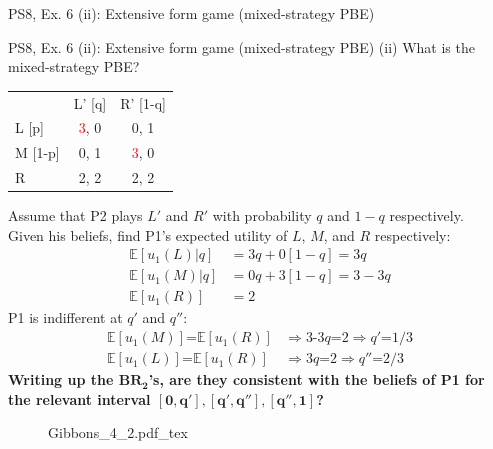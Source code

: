 \begin{frame}{PS8, Ex. 6 (ii): Extensive form game (mixed-strategy PBE)}
\begin{multicols}{2}
      \vfill\null
    \end{multicols}
\end{frame}
\begin{frame}{PS8, Ex. 6 (ii): Extensive form game (mixed-strategy PBE)}
    (ii) What is the mixed-strategy PBE? \vspace{-8pt}
    \begin{multicols}{2}
      \begin{table}
        \begin{tabular}{l|c|c|}
          \multicolumn{1}{c}{} & \multicolumn{1}{c}{L' [q]} & \multicolumn{1}{c}{R' [1-q]} \\\cline{2-3}
          L [p]   & \textcolor{red}{3}, 0 & 0, \color{blue}1 \\\cline{2-3}
          M [1-p] & 0, \color{blue}1 & \textcolor{red}{3}, 0 \\\cline{2-3}
          R       & 2, \color{blue}2 & 2, \color{blue}2 \\\cline{2-3}
        \end{tabular}
      \end{table} \vspace{-4pt}
      Assume that P2 plays $L'$ and $R'$ with probability $q$ and $1-q$ respectively.\\\smallskip
      Given his beliefs, find P1's expected utility of $L$, $M$, and $R$ respectively: \vspace{-4pt}
      \begin{align*}
        \mathbb{E}[u_1(L)|q]&=3q+0[1-q]=3q\\
        \mathbb{E}[u_1(M)|q]&=0q+3[1-q]=3-3q\\
        \mathbb{E}[u_1(R)]&=2
      \end{align*}
      P1 is indifferent at $q'$ and $q''$: \vspace{-6pt}
      \begin{align*}
        \mathbb{E}[u_1(M)]\text{=}\mathbb{E}[u_1(R)]&\Rightarrow \text{3-3}q\text{=}2\Rightarrow q'\text{=}1/3\\
        \mathbb{E}[u_1(L)]\text{=}\mathbb{E}[u_1(R)]&\Rightarrow 3q\text{=}2\Rightarrow q''\text{=}2/3
      \end{align*}
      \textbf{Writing up the $\bm{BR_2}$'s, are they consistent with the beliefs of P1 for the relevant interval $\bm{[0,q'],[q',q''],[q'',1]}$?}
      \vfill\null\columnbreak
      \begin{figure}[!h]
        \center {}
        {Gibbons_4_2.pdf_tex}

\end{figure}
\end{multicols}
\end{frame}
